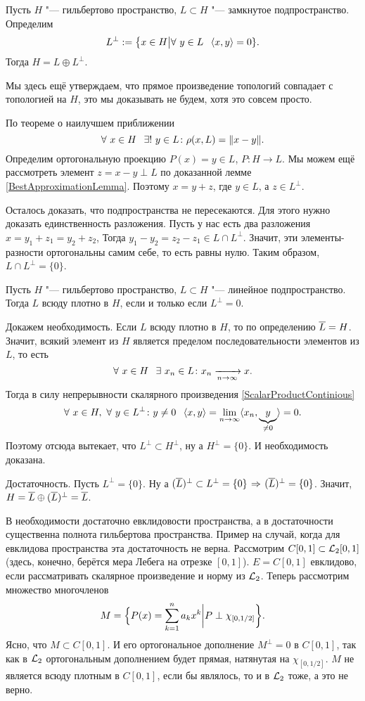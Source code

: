 \begin{The}
  Пусть $H$ "--- гильбертово пространство, $L\subset H$ "--- замкнутое подпространство. Определим
\[
  L^{\perp} := \big\{x\in H\big|\forall\ y\in L\pau \la x,y\ra =0\}.
\]
Тогда $H = L\oplus L^{\perp}$.
\end{The}
Мы здесь ещё утверждаем, что прямое произведение топологий совпадает с топологией на $H$, это мы доказывать не будем, хотя это совсем просто.
\begin{Proof}
  По теореме о наилучшем приближении 
\[
 \forall\ x\in H\pau \exists!\ y\in L\colon \rho(x,L) = \|x-y\|.
\]
Определим ортогональную проекцию $P(x) = y\in L$, $P\colon H\to L$. Мы можем ещё рассмотреть элемент $z = x-y\perp L$ по доказанной лемме \ref{BestApproximationLemma}. Поэтому $x = y+z$, где $y\in L$, а $z\in L^{\perp}$.

Осталось доказать, что подпространства не пересекаются. Для этого нужно доказать единственность разложения. Пусть у нас есть два разложения $x = y_1+z_1 = y_2+ z_2$, Тогда $y_1-y_2=z_2-z_1\in L\cap L^{\perp}$. Значит, эти элементы-разности ортогональны самим себе, то есть равны нулю. Таким образом, $L\cap L^{\perp} = \{0\}$.
\end{Proof}
\begin{Sl}\label{ortdens}
   Пусть $H$ "--- гильбертово пространство, $L\subset H$ "--- линейное подпространство. Тогда $L$ всюду плотно в $H$, если и только если $L^\perp =0$.
\end{Sl}
\begin{Proof}
  Докажем необходимость. Если $L$ всюду плотно в $H$, то по определению $\overline{L}=H$. Значит, всякий элемент из $H$ является пределом последовательности элементов из $L$, то есть 
\[
  \forall\ x\in H\pau \exists\ x_n\in L\colon x_n\te x.
\]
Тогда в силу непрерывности скалярного произведения \ref{ScalarProductContinious} 
\[
	\forall\ x\in H,\ 
  \forall\ y\in L^\perp\colon y\ne0\pau \la x,y\ra = \yo n\infty \la x_n,\underbrace{y}_{\ne0}\ra = 0.
\]
Поэтому отсюда вытекает, что $L^\perp\subset H^\perp$, ну а $H^{\perp} = \{0\}$. И необходимость доказана.

Достаточность. Пусть $L^\perp = \{0\}$. Ну а $(\overline{L})^\perp\subset L^\perp = \{0\}\hspace{1pt plus1pt}\Rightarrow\hspace{1pt plus1pt} (\overline{L})^\perp=\{0\}$. Значит, $H = \overline{L}\oplus {(\overline{L})^\perp} = \overline{L}$.
\end{Proof}

В необходимости достаточно евклидовости пространства, а в достаточности существенна полнота гильбертова пространства.
Пример на случай, когда для евклидова пространства эта достаточность не верна. Рассмотрим $C[0,1]\subset \mathcal L_2[0,1]$ (здесь, конечно, берётся мера Лебега на отрезке $[0,1]$). $E = C[0,1]$ евклидово, если рассматривать скалярное произведение и норму из $\mathcal L_2$. Теперь рассмотрим множество многочленов 
\[
  M = \Big\{P(x) = \sum\limits_{k = 1}^{n}a_kx^k\bigg| P\perp\chi_{[0,1/2]}\bigg\}.
\]
Ясно, что $M\subset C[0,1]$.
И его ортогональное дополнение $M^\perp=0$ в $C[0,1]$, так как в $\mathcal L_2$ ортогональным дополнением будет прямая, натянутая на $\chi_{[0,1/2]}$. $M$ не является всюду плотным в $C[0,1]$, если бы являлось, то и в $\mathcal L_2$ тоже, а это не верно.
